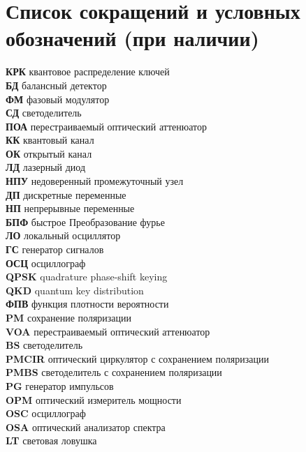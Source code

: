 \chapter*{Список сокращений и условных обозначений (при наличии)} %
\noindent
\textbf{КРК} квантовое распределение ключей \\
\textbf{БД} балансный детектор \\
\textbf{ФМ} фазовый модулятор\\
\textbf{СД} светоделитель\\
\textbf{ПОА} перестраиваемый оптический аттенюатор\\ 
\textbf{КК} квантовый канал\\ 
\textbf{ОК} открытый канал\\ 
\textbf{ЛД} лазерный диод\\ 
\textbf{НПУ} недоверенный промежуточный узел\\ 
\textbf{ДП} дискретные переменные\\ 
\textbf{НП} непрерывные переменные\\ 
\textbf{БПФ} быстрое Преобразование фурье\\ 
\textbf{ЛО} локальный осциллятор\\ 
\textbf{ГС} генератор сигналов\\ 
\textbf{ОСЦ} осциллограф\\ 
\textbf{QPSK} quadrature phase-shift keying\\ 
\textbf{QKD} quantum key distribution\\ 
\textbf{ФПВ} функция плотности вероятности\\ 
\textbf{PM} сохранение поляризации\\ 
\textbf{VOA} перестраиваемый оптический аттенюатор\\ 
\textbf{BS} светоделитель\\ 
\textbf{PMCIR} оптический циркулятор с сохранением поляризации\\ 
\textbf{PMBS} светоделитель с сохранением поляризации\\
\textbf{PG} генератор импульсов\\ 
\textbf{OPM} оптический измеритель мощности\\ 
\textbf{OSC} осциллограф\\ 
\textbf{OSA} оптический анализатор спектра\\ 
\textbf{LT} световая ловушка\\ 

